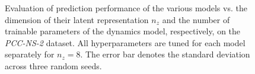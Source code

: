 \begin{figure}[ht]
    \centering
    \caption{Evaluation of prediction performance of the various models vs. the dimension of their latent representation $n_z$ and the number of trainable parameters of the dynamics model, respectively, on the \emph{PCC-NS-2} dataset. All hyperparameters are tuned for each model separately for $n_z=8$. The error bar denotes the standard deviation across three random seeds.} \label{fig:con:latent_dynamics_sweep_pcc_ns-2}
\end{figure}

